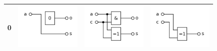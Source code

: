 \begin{figure}[!h]
\begin{tabular}{r|c|c|c}
    0 & \begin{minipage}{0.29\textwidth}\includegraphics[scale=1]{images/halfadder0}\end{minipage} & \begin{minipage}{0.29\textwidth}\includegraphics[scale=1]{images/fulladder0}\end{minipage} & \begin{minipage}{0.29\textwidth}\includegraphics[scale=1]{images/lastadder0}\end{minipage}\\
    \hline

\end{tabular}
\end{figure}
